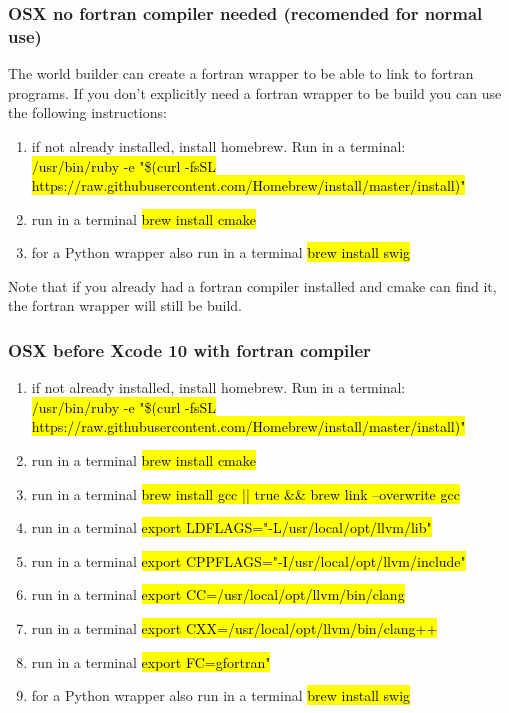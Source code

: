 \documentclass{book}
\begin{document}
\subsubsection{OSX no fortran compiler needed (recomended for normal use)}
The world builder can create a fortran wrapper to be able to link to fortran programs. If you don't explicitly need a fortran wrapper to be build you can use the following instructions:
\begin{enumerate}
    \item if not already installed, install homebrew. Run in a terminal:\\ \hl{/usr/bin/ruby -e "\$(curl -fsSL https://raw.githubusercontent.com/Homebrew/install/master/install)"}
    \item run in a terminal \hl{brew install cmake} 
    \item for a Python wrapper also run in a terminal \hl{brew install swig} 
\end{enumerate}
Note that if you already had a fortran compiler installed and cmake can find it, the fortran wrapper will still be build.
\subsubsection{OSX before Xcode 10 with fortran compiler}
\begin{enumerate}
    \item if not already installed, install homebrew. Run in a terminal:\\ \hl{/usr/bin/ruby -e "\$(curl -fsSL https://raw.githubusercontent.com/Homebrew/install/master/install)"}
    \item run in a terminal \hl{brew install cmake} 
    \item run in a terminal \hl{brew install gcc || true  \&\& brew link --overwrite gcc} 
    \item run in a terminal \hl{export LDFLAGS="-L/usr/local/opt/llvm/lib"}
    \item run in a terminal \hl{export CPPFLAGS="-I/usr/local/opt/llvm/include"}
    \item run in a terminal \hl{export CC=/usr/local/opt/llvm/bin/clang}
    \item run in a terminal \hl{export CXX=/usr/local/opt/llvm/bin/clang++}
    \item run in a terminal \hl{export FC=gfortran"}
    \item for a Python wrapper also run in a terminal \hl{brew install swig} 
\end{enumerate}
\end{document}
